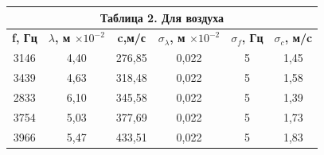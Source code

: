 \documentclass[11pt,a4paper,oneside]{article}
\begin{document}
\begin{enumerate}
\begin{table}[h!]
\begin{center}
\begin{tabular}{cccccc}
\multicolumn{6}{c}{\textbf{Таблица 2. Для воздуха}}                                                                                                                                                                                                                                                                                                   \\ \hline
\multicolumn{1}{|c|}{\textbf{f, Гц}} & \multicolumn{1}{c|}{\textbf{$\lambda$, м $\times 10^{-2}$}} & \multicolumn{1}{c|}{\textbf{c,м/с}} & \multicolumn{1}{c|}{\textbf{$\sigma_{\lambda}$, м $\times 10^{-2}$}} & \multicolumn{1}{c|}{\textbf{$\sigma_{f}$, Гц}} & \multicolumn{1}{c|}{\textbf{$\sigma_{c}$, м/c}} \\ \hline
\multicolumn{1}{|c|}{3146}           & \multicolumn{1}{c|}{4,40}                                               & \multicolumn{1}{c|}{276,85}         & \multicolumn{1}{c|}{0,022}                                                      & \multicolumn{1}{c|}{5}                         & \multicolumn{1}{c|}{1,45}                       \\ \hline
\multicolumn{1}{|c|}{3439}           & \multicolumn{1}{c|}{4,63}                                               & \multicolumn{1}{c|}{318,48}         & \multicolumn{1}{c|}{0,022}                                                      & \multicolumn{1}{c|}{5}                         & \multicolumn{1}{c|}{1,58}                       \\ \hline
\multicolumn{1}{|c|}{2833}           & \multicolumn{1}{c|}{6,10}                                               & \multicolumn{1}{c|}{345,58}         & \multicolumn{1}{c|}{0,022}                                                      & \multicolumn{1}{c|}{5}                         & \multicolumn{1}{c|}{1,39}                       \\ \hline
\multicolumn{1}{|c|}{3754}           & \multicolumn{1}{c|}{5,03}                                               & \multicolumn{1}{c|}{377,69}         & \multicolumn{1}{c|}{0,022}                                                      & \multicolumn{1}{c|}{5}                         & \multicolumn{1}{c|}{1,73}                       \\ \hline
\multicolumn{1}{|c|}{3966}           & \multicolumn{1}{c|}{5,47}                                               & \multicolumn{1}{c|}{433,51}         & \multicolumn{1}{c|}{0,022}                                                      & \multicolumn{1}{c|}{5}                         & \multicolumn{1}{c|}{1,83}                       \\ \hline
\end{tabular}
\end{center}
\end{table}


\end{enumerate}
\end{document}
